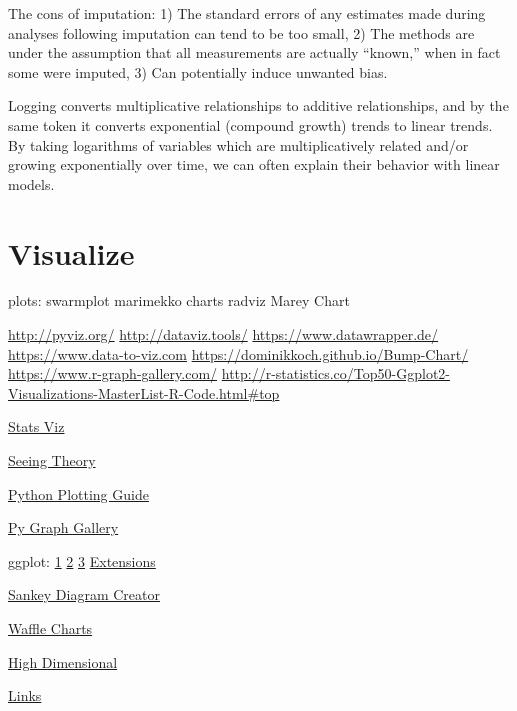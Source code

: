 \documentclass[]{book}
\begin{document}
The cons of imputation: 1) The standard errors of any estimates made during analyses following imputation can tend to be too small, 2) The methods are under the assumption that all measurements are actually ``known,'' when in fact some were imputed, 3) Can potentially induce unwanted bias.

Logging converts multiplicative relationships to additive relationships, and by the same token it converts exponential (compound growth) trends to linear trends. By taking logarithms of variables which are multiplicatively related and/or growing exponentially over time, we can often explain their behavior with linear models.

\hypertarget{visualize}{%
\section{Visualize}\label{visualize}}

plots: swarmplot \textbar{} marimekko charts \textbar{} radviz \textbar{} Marey Chart

\url{http://pyviz.org/} \url{http://dataviz.tools/} \url{https://www.datawrapper.de/} \url{https://www.data-to-viz.com} \url{https://dominikkoch.github.io/Bump-Chart/} \url{https://www.r-graph-gallery.com/} \url{http://r-statistics.co/Top50-Ggplot2-Visualizations-MasterList-R-Code.html\#top}

\href{http://emilkirkegaard.dk/understanding_statistics/}{Stats Viz}

\href{http://students.brown.edu/seeing-theory/}{Seeing Theory}

\href{http://pythonplot.com/}{Python Plotting Guide}

\href{https://python-graph-gallery.com}{Py Graph Gallery}

ggplot: \href{https://www.pitt.edu/~naraehan/presentation/Graphs_and_Plots_using_Plotly.html}{1} \href{https://plot.ly/python/table/}{2} \href{https://plot.ly/python/html-reports/}{3} \href{http://www.ggplot2-exts.org/gallery/}{Extensions}

\href{http://sankeymatic.com}{Sankey Diagram Creator}

\href{https://nsaunders.wordpress.com/2017/09/08/infographic-style-charts-using-the-r-waffle-package/}{Waffle Charts}

\href{https://research.googleblog.com/2016/12/open-sourcing-embedding-projector-tool.html}{High Dimensional}

\href{http://www.thehackerwithin.org/swinburne/links.html}{Links}
\end{document}
